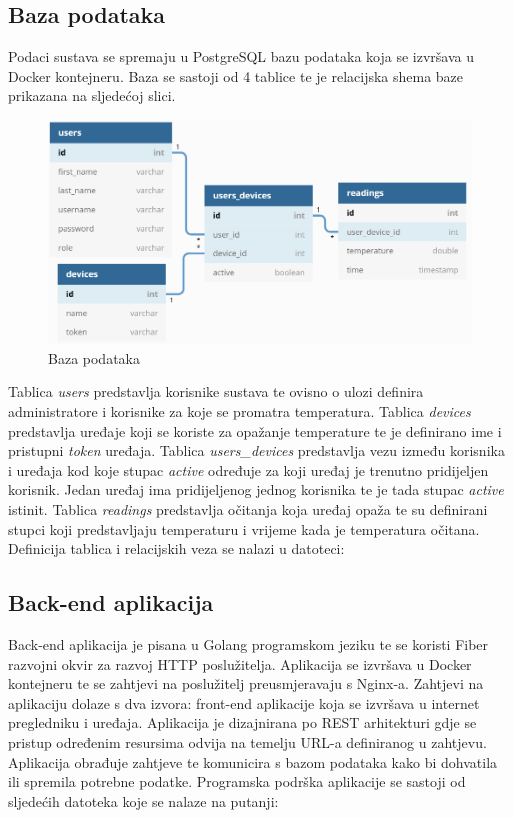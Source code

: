 \documentclass[times, utf8, diplomski]{fer}
\begin{document}
\subsection{Baza podataka}
Podaci sustava se spremaju u PostgreSQL bazu podataka koja se izvršava u Docker kontejneru. Baza se sastoji od 4 tablice te je relacijska shema baze prikazana na sljedećoj slici.
\begin{figure}[H]
    \centering
    \includegraphics[width=14.5cm]{images/baza.png}
    \caption{Baza podataka}
    \label{fig:baza}
\end{figure}

Tablica \emph{users} predstavlja korisnike sustava te ovisno o ulozi  definira administratore i korisnike za koje se promatra temperatura. Tablica \emph{devices} predstavlja uređaje koji se koriste za opažanje temperature te je definirano ime i pristupni \emph{token} uređaja. Tablica \emph{users\_devices} predstavlja vezu između korisnika i uređaja kod koje stupac \emph{active} određuje za koji uređaj je trenutno pridijeljen korisnik. Jedan uređaj ima pridijeljenog jednog korisnika te je tada stupac \emph{active} istinit. Tablica \emph{readings} predstavlja očitanja koja uređaj opaža te su definirani stupci koji predstavljaju temperaturu i vrijeme kada je temperatura očitana. Definicija tablica i relacijskih veza se nalazi u datoteci: 

\subsection{Back-end aplikacija}
Back-end aplikacija je pisana u Golang programskom jeziku te se koristi Fiber razvojni okvir za razvoj HTTP poslužitelja. Aplikacija se izvršava u Docker kontejneru te se zahtjevi na poslužitelj preusmjeravaju s Nginx-a. Zahtjevi na aplikaciju dolaze s dva izvora: front-end aplikacije koja se izvršava u internet pregledniku i uređaja. Aplikacija je dizajnirana po REST arhitekturi gdje se pristup određenim resursima odvija na temelju URL-a definiranog u zahtjevu. Aplikacija obrađuje zahtjeve te komunicira s bazom podataka kako bi dohvatila ili spremila potrebne podatke. Programska podrška aplikacije se sastoji od sljedećih datoteka koje se nalaze na putanji: 
\end{document}
